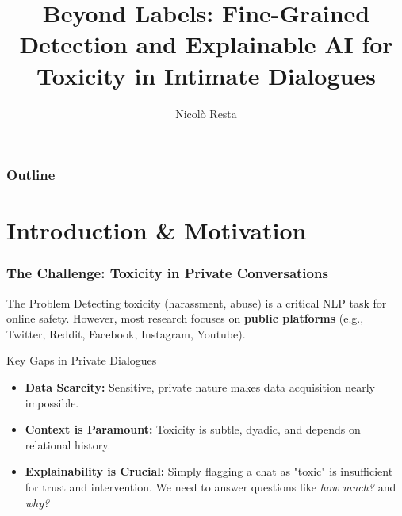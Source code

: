 \documentclass[aspectratio=169]{beamer}
\title[Toxicity in Intimate Dialogues]{
  Beyond Labels: 
  Fine-Grained Detection and Explainable AI 
  for Toxicity in Intimate Dialogues
}
\author{Nicolò Resta}
\institute{University of Bari, Aldo Moro}
\begin{document}
{
  \begin{frame}
    \titlepage
  \end{frame}
}

\begin{frame}
  \frametitle{Outline}
  \tableofcontents
\end{frame}

\section{Introduction \& Motivation}

\begin{frame}
  \frametitle{The Challenge: Toxicity in Private Conversations}
  \begin{block}{The Problem}
        Detecting toxicity (harassment, abuse) is a critical NLP task for online safety.
        However, most research focuses on \textbf{public platforms} (e.g., Twitter, Reddit, Facebook, Instagram, Youtube).
      \end{block}
      
      \begin{alertblock}{Key Gaps in Private Dialogues}
        \begin{itemize}
          \item \textbf{Data Scarcity:} Sensitive, private nature makes data acquisition nearly impossible.
          \item \textbf{Context is Paramount:} Toxicity is subtle, dyadic, and depends on relational history.
          \item \textbf{Explainability is Crucial:} Simply flagging a chat as "toxic" is insufficient for trust and intervention. We need to answer questions like \textit{how much?} and \textit{why?}
        \end{itemize}
      \end{alertblock}
\end{frame}
\end{document}
